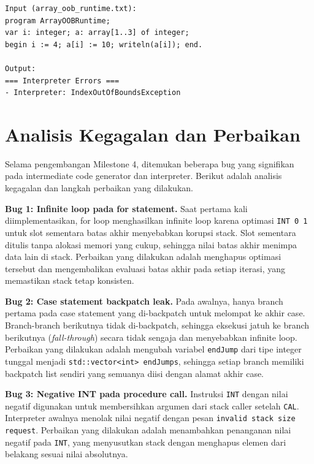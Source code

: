\begin{lstlisting}[basicstyle=\ttfamily\scriptsize,breaklines=true,frame=single,numbers=none]
Input (array_oob_runtime.txt):
program ArrayOOBRuntime;
var i: integer; a: array[1..3] of integer;
begin i := 4; a[i] := 10; writeln(a[i]); end.

Output:
=== Interpreter Errors ===
- Interpreter: IndexOutOfBoundsException
\end{lstlisting}

\section{Analisis Kegagalan dan Perbaikan}
Selama pengembangan Milestone 4, ditemukan beberapa bug yang signifikan pada intermediate code generator dan interpreter. Berikut adalah analisis kegagalan dan langkah perbaikan yang dilakukan.

\textbf{Bug 1: Infinite loop pada for statement.} Saat pertama kali diimplementasikan, for loop menghasilkan infinite loop karena optimasi \texttt{INT 0 1} untuk slot sementara batas akhir menyebabkan korupsi stack. Slot sementara ditulis tanpa alokasi memori yang cukup, sehingga nilai batas akhir menimpa data lain di stack. Perbaikan yang dilakukan adalah menghapus optimasi tersebut dan mengembalikan evaluasi batas akhir pada setiap iterasi, yang memastikan stack tetap konsisten.

\textbf{Bug 2: Case statement backpatch leak.} Pada awalnya, hanya branch pertama pada case statement yang di-backpatch untuk melompat ke akhir case. Branch-branch berikutnya tidak di-backpatch, sehingga eksekusi jatuh ke branch berikutnya (\textit{fall-through}) secara tidak sengaja dan menyebabkan infinite loop. Perbaikan yang dilakukan adalah mengubah variabel \texttt{endJump} dari tipe integer tunggal menjadi \texttt{std::vector<int> endJumps}, sehingga setiap branch memiliki backpatch list sendiri yang semuanya diisi dengan alamat akhir case.

\textbf{Bug 3: Negative INT pada procedure call.} Instruksi \texttt{INT} dengan nilai negatif digunakan untuk membersihkan argumen dari stack caller setelah \texttt{CAL}. Interpreter awalnya menolak nilai negatif dengan pesan \texttt{invalid stack size request}. Perbaikan yang dilakukan adalah menambahkan penanganan nilai negatif pada \texttt{INT}, yang menyusutkan stack dengan menghapus elemen dari belakang sesuai nilai absolutnya.

